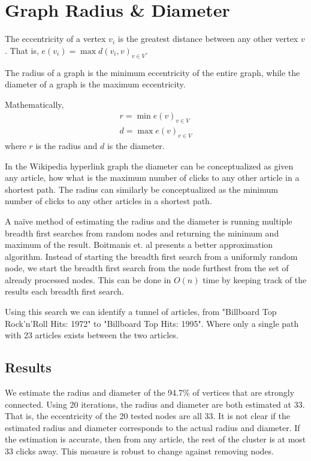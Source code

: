 \documentclass{article}
\begin{document}


\section{Graph Radius \& Diameter}

The eccentricity of a vertex $v_i$ is the greatest distance between any other vertex $v$. That is, $e(v_i) = \max d(v_i, v)_{v \in V}$.

The radius of a graph is the minimum eccentricity of the entire graph, while the diameter of a graph is the maximum eccentricity.


Mathematically,
\begin{align*}
    r = \min e(v)_{v \in V} \\
    d = \max e(v)_{v \in V}
\end{align*}
where $r$ is the radius and $d$ is the diameter.

In the Wikipedia hyperlink graph the diameter can be conceptualized as given any article, how what is the maximum number of clicks to any other article in a shortest path. The radius can similarly be conceptualized as the minimum number of clicks to any other articles in a shortest path.


A naïve method of estimating the radius and the diameter is running multiple breadth first searches from random nodes and returning the minimum and maximum of the result. Boitmanis et. al presents a better approximation algorithm.
\autocite{boitmanis}
Instead of starting the breadth first search from a uniformly random node, we start the breadth first search from the node furthest from the set of already processed nodes. This can be done in $O(n)$ time by keeping track of the results each breadth first search.

Using this search we can identify a tunnel of articles, from "Billboard Top Rock'n'Roll Hits: 1972" to "Billboard Top Hits: 1995". Where only a single path with 23 articles exists between the two articles.


\subsection{Results}

We estimate the radius and diameter of the 94.7\% of vertices that are strongly connected.
Using 20 iterations, the radius and diameter are both estimated at 33. That is, the eccentricity of the 20 tested nodes are all 33.
It is not clear if the estimated radius and diameter corresponds to the actual radius and diameter.
If the estimation is accurate, then from any article, the rest of the cluster is at most 33 clicks away.
This measure is robust to change against removing nodes.
\end{document}
